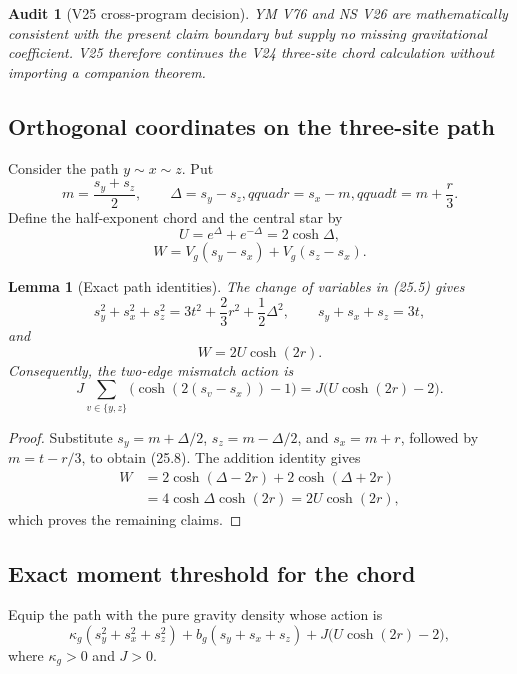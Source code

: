 \documentclass[11pt]{article}
\newtheorem{lemma}[theorem]{Lemma}
\newtheorem{audit}[theorem]{Audit}
\theoremstyle{remark}
\begin{document}
\begin{audit}[V25 cross-program decision]
\label{aud:v17v25-companions}
YM V76 and NS V26 are mathematically consistent with the present claim
boundary but supply no missing gravitational coefficient.  V25
therefore continues the V24 three-site chord calculation without
importing a companion theorem.
\end{audit}

\subsection{Orthogonal coordinates on the three-site path}

Consider the path \(y\sim x\sim z\).  Put
\[
 m=\frac{s_y+s_z}{2},\qquad
 \Delta=s_y-s_z,qquad
 r=s_x-m,qquad
 t=m+\frac r3.                                     \tag{25.5}
\]
Define the half-exponent chord and the central star by
\[
 U=e^{\Delta}+e^{-\Delta}=2\cosh\Delta,            \tag{25.6}
\]
\[
 W=V_g(s_y-s_x)+V_g(s_z-s_x).                      \tag{25.7}
\]

\begin{lemma}[Exact path identities]
\label{lem:v17v25-identities}
The change of variables in (25.5) gives
\[
 s_y^2+s_x^2+s_z^2
 =3t^2+\frac23r^2+\frac12\Delta^2,
 \qquad s_y+s_x+s_z=3t,                            \tag{25.8}
\]
and
\[
 W=2U\cosh(2r).                                    \tag{25.9}
\]
Consequently, the two-edge mismatch action is
\[
 J\sum_{v\in\{y,z\}}
 \bigl(\cosh(2(s_v-s_x))-1\bigr)
 =J\bigl(U\cosh(2r)-2\bigr).                      \tag{25.10}
\]
\end{lemma}

\begin{proof}
Substitute
\(s_y=m+\Delta/2\), \(s_z=m-\Delta/2\), and \(s_x=m+r\), followed
by \(m=t-r/3\), to obtain (25.8).  The addition identity gives
\[
\begin{aligned}
 W
 &=2\cosh(\Delta-2r)+2\cosh(\Delta+2r)\\
 &=4\cosh\Delta\cosh(2r)=2U\cosh(2r),             \tag{25.11}
\end{aligned}
\]
which proves the remaining claims.
\end{proof}

\subsection{Exact moment threshold for the chord}

Equip the path with the pure gravity density whose action is
\[
 \kappa_g(s_y^2+s_x^2+s_z^2)
 +b_g(s_y+s_x+s_z)
 +J\bigl(U\cosh(2r)-2\bigr),                       \tag{25.12}
\]
where \(\kappa_g>0\) and \(J>0\).
\end{document}
